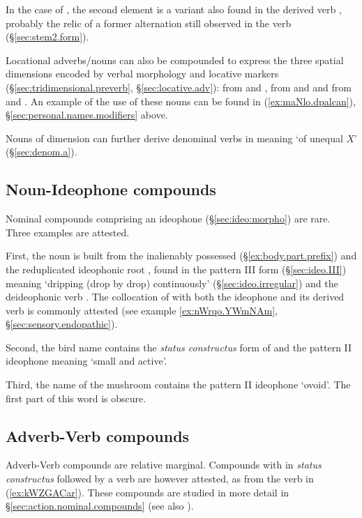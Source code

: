 In the case of , the second element  is a variant also found in the derived verb , probably the relic of a former  alternation still observed in the verb  (§\ref{sec:stem2.form}).

Locational adverbs/nouns can also be compounded to express the three spatial dimensions encoded by verbal morphology and locative markers  (§\ref{sec:tridimensional.preverb}, §\ref{sec:locative.adv}):  from  and ,  from  and  and  from  and . An example of the use of these nouns can be found in (\ref{ex:maNlo.dpalcan}), §\ref{sec:personal.names.modifiers} above.

Nouns of dimension can further derive denominal verbs in  meaning `of unequal $X$' (§\ref{sec:denom.a}).

\subsection{Noun-Ideophone compounds} \label{sec.n.idph.compounds}
Nominal compounds comprising an ideophone (§\ref{sec:ideo:morpho}) are rare. Three examples are attested.
 
First, the noun  is built from the inalienably possessed  (§\ref{ex:body.part.prefix}) and the reduplicated ideophonic root , found in the pattern III form (§\ref{sec:ideo.III})  meaning `dripping (drop by drop) continuously' (§\ref{sec:ideo.irregular}) and the deideophonic verb . The collocation of  with both the ideophone and its derived verb is commonly attested (see example \ref{ex:nWrqo.YWmNAm}, §\ref{sec:sensory.endopathic}).
  
Second, the bird name  contains the  \textit{status constructus} form of  and the pattern II ideophone   meaning `small and active'.


Third, the name of the mushroom  contains the pattern II ideophone  `ovoid'. The first part of this word is obscure.

\subsection{Adverb-Verb compounds} \label{sec.adv.v.compounds}
Adverb-Verb compounds are relative marginal. Compounds with  in \textit{status constructus}  followed by a verb are however attested, as  from the verb  in (\ref{ex:kWZGACar}). These compounds are studied in more detail in §\ref{sec:action.nominal.compounds} (see also \citealt[252]{jacques16complementation}).

